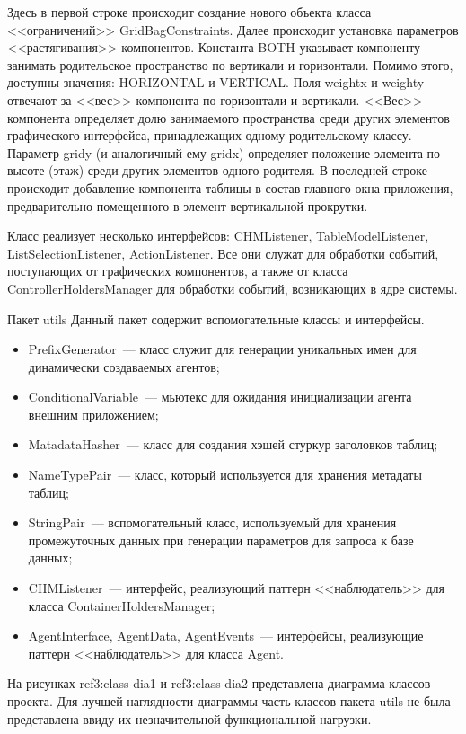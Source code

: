 Здесь в первой строке происходит создание нового объекта класса <<ограничений>> GridBagConstraints. Далее происходит установка параметров <<растягивания>> компонентов. Константа BOTH указывает компоненту занимать родительское пространство по вертикали и горизонтали. Помимо этого, доступны значения: HORIZONTAL и VERTICAL. Поля weightx и weighty отвечают за <<вес>> компонента по горизонтали и вертикали. <<Вес>> компонента определяет долю занимаемого пространства среди других элементов графического интерфейса, принадлежащих одному родительскому классу. Параметр gridy (и аналогичный ему gridx) определяет положение элемента по высоте (этаж) среди других элементов одного родителя. В последней строке происходит добавление компонента таблицы в состав главного окна приложения, предварительно помещенного в элемент вертикальной прокрутки.

Класс реализует несколько интерфейсов: CHMListener, TableModelListener, ListSelectionListener, ActionListener. Все они служат для обработки событий, поступающих от графических компонентов, а также от класса ControllerHoldersManager для обработки событий, возникающих в ядре системы.

{Пакет utils}
Данный пакет содержит вспомогательные классы и интерфейсы.
\begin{itemize}
\item PrefixGenerator~--- класс служит для генерации уникальных имен для динамически создаваемых агентов;
\item ConditionalVariable~--- мьютекс для ожидания инициализации агента внешним приложением;
\item MatadataHasher~--- класс для создания хэшей стуркур заголовков таблиц;
\item NameTypePair~--- класс, который используется для хранения метадаты таблиц;
\item StringPair~--- вспомогательный класс, используемый для хранения промежуточных данных при генерации параметров для запроса к базе данных;
\item CHMListener~--- интерфейс, реализующий паттерн <<наблюдатель>> для класса ContainerHoldersManager;
\item AgentInterface, AgentData, AgentEvents~--- интерфейсы, реализующие паттерн <<наблюдатель>> для класса Agent.
\end{itemize}

На рисунках ref{3:class-dia1} и ref{3:class-dia2} представлена диаграмма классов проекта. Для лучшей наглядности диаграммы часть классов пакета utils не была представлена ввиду их незначительной функциональной нагрузки.

